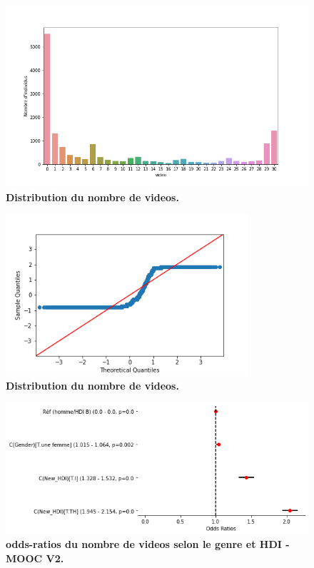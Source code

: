 \documentclass[12pt, a4paper, titlepage, table]{article}
\begin{document}
\begin{figure}[H]
	\centering
	\includegraphics[width=1\textwidth]{../../graph/distribution_poisson.png}
	\caption{\textbf{Distribution du nombre de videos.}}
\end{figure}

\begin{figure}[H]
	\centering
	\includegraphics[width=0.8\textwidth]{../../graph/distribution_video4.png}
	\caption{\textbf{Distribution du nombre de videos.}}
\end{figure}


\begin{figure}[H]
	\centering
	\includegraphics[width=1\textwidth]{../../graph/forestplot_V1_poisson.png}
	\caption{\textbf{odds-ratios du nombre de videos selon le genre et HDI - MOOC V2.}}
\end{figure}
\end{document}
